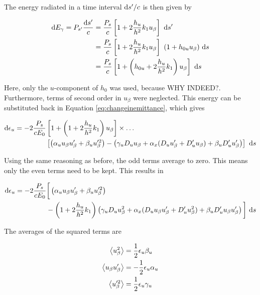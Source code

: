 The energy radiated in a time interval $\text{d} s' / c$ is then given by

\begin{align}
    \text{d} E_\gamma = P_{s'} \frac{\text{d} s'}{c} &= \frac{P_s}{c} \left[ 1 + 2 \frac{h_u}{h^2} k_1 u_\beta \right]\ \text{d} s'\\
                                             &= \frac{P_s}{c} \left[ 1 + 2 \frac{h_u}{h^2} k_1 u_\beta \right]\ (1 + h_{0u} u_\beta)\ \text{d} s\\
                                             &= \frac{P_s}{c} \left[ 1 + \left( h_{0u} + 2 \frac{h_u}{h^2} k_1 \right) u_\beta \right]\ \text{d} s
\end{align}

Here, only the $u$-component of $h_0$ was used, because {\color{red} WHY INDEED?}. Furthermore, terms of second order in $u_\beta$ were neglected. This energy can be substituted back in Equation \eqref{eq:changeinemittance}, which gives

\begin{align}
    \dee \epsilon_u = - 2 \frac{P_s}{cE_0} &\left[ 1 + \left( 1 + 2 \frac{h_u}{h^2} k_1 \right) u_\beta \right] \times \dots \\
                    & \left[ \left( \alpha_u u_\beta u_\beta' + \beta_u u_\beta'^2 \right)  - \left( \gamma_u D_u u_\beta + \alpha_x (D_u u_\beta' + D_u' u_\beta) + \beta_u D_u' u_\beta' \right)\right] \ \dee s
\end{align}

Using the same reasoning as before, the odd terms average to zero. This means only the even terms need to be kept. This results in

\begin{align}
    \text{d} \epsilon_u = - 2 \frac{P_s}{cE_0} &\bigg[ \left( \alpha_u u_\beta u_\beta' + \beta_u u_\beta'^2 \right) \\
    &- \left( 1 + 2 \frac{h_u}{h^2} k_1 \right) \left( \gamma_u D_u u_\beta^2 + \alpha_x (D_u u_\beta u_\beta' + D_u' u_\beta^2) + \beta_u D_u' u_\beta u_\beta' \right) \bigg]\ \text{d} s
\end{align}

The averages of the squared terms are

\begin{align}
    \left\langle {u_\beta^2} \right\rangle        &=   \frac{1}{2} \epsilon_u \beta_u\\
    \left\langle {u_\beta u_\beta'} \right\rangle &= - \frac{1}{2} \epsilon_u \alpha_u\\
    \left\langle {u_\beta'^2} \right\rangle       &=   \frac{1}{2} \epsilon_u \gamma_u
\end{align}

